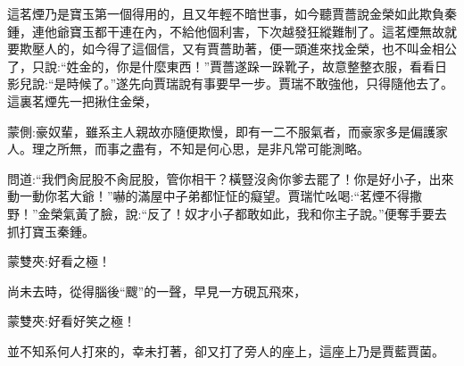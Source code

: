 \begin{parag}
    這茗煙乃是寶玉第一個得用的，且又年輕不暗世事，如今聽賈薔說金榮如此欺負秦鍾，連他爺寶玉都干連在內，不給他個利害，下次越發狂縱難制了。這茗煙無故就要欺壓人的，如今得了這個信，又有賈薔助著，便一頭進來找金榮，也不叫金相公了，只說:“姓金的，你是什麼東西！”賈薔遂跺一跺靴子，故意整整衣服，看看日影兒說:“是時候了。”遂先向賈瑞說有事要早一步。賈瑞不敢強他，只得隨他去了。這裏茗煙先一把揪住金榮，\begin{note}蒙側:豪奴輩，雖系主人親故亦隨便欺慢，即有一二不服氣者，而豪家多是偏護家人。理之所無，而事之盡有，不知是何心思，是非凡常可能測略。\end{note}問道:“我們肏屁股不肏屁股，管你相干？橫豎沒肏你爹去罷了！你是好小子，出來動一動你茗大爺！”嚇的滿屋中子弟都怔怔的癡望。賈瑞忙吆喝:“茗煙不得撒野！”金榮氣黃了臉，說:“反了！奴才小子都敢如此，我和你主子說。”便奪手要去抓打寶玉秦鍾。\begin{note}蒙雙夾:好看之極！\end{note}尚未去時，從得腦後“颼”的一聲，早見一方硯瓦飛來，\begin{note}蒙雙夾:好看好笑之極！\end{note}並不知系何人打來的，幸未打著，卻又打了旁人的座上，這座上乃是賈藍賈菌。
\end{parag}


